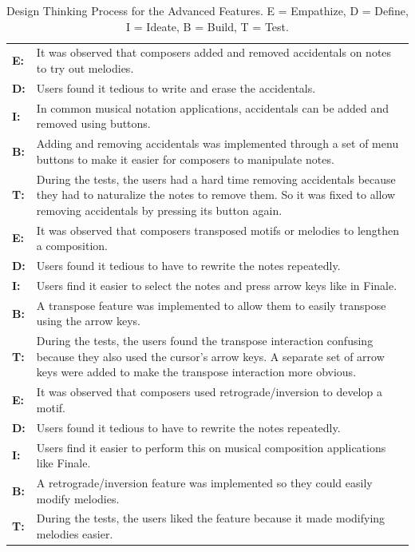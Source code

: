 		\begin{table} [H]
			\caption{Design Thinking Process for the Advanced Features. E = Empathize, D = Define, I = Ideate, B = Build, T = Test.} \label{tab:design-thinking-advanced}
			\vspace{0.20cm}   
			\begin{tabular}{|p{2.5cm} p{12.5cm}|}
			  	\hline

			  	\textbf{E:} 	& It was observed that composers added and removed accidentals on notes to try out melodies. \\
			  	\textbf{D:} 	& Users found it tedious to write and erase the accidentals. \\
			  	\textbf{I:} 		& In common musical notation applications, accidentals can be added and removed using buttons. \\
			  	\textbf{B:} 	& Adding and removing accidentals was implemented through a set of menu buttons to make it easier for composers to manipulate notes. \\
			  	\textbf{T:} 	& During the tests, the users had a hard time removing accidentals because they had to naturalize the notes to remove them. So it was fixed to allow removing accidentals by pressing its button again. \\
			  	\hline
			  	
			  	\textbf{E:} 	& It was observed that composers transposed motifs or melodies to lengthen a composition. \\
			  	\textbf{D:} 	& Users found it tedious to have to rewrite the notes repeatedly. \\
			  	\textbf{I:} 		& Users find it easier to select the notes and press arrow keys like in Finale. \\
			  	\textbf{B:} 	& A transpose feature was implemented to allow them to easily transpose using the arrow keys. \\
			  	\textbf{T:} 	& During the tests, the users found the transpose interaction confusing because they also used the cursor's arrow keys. A separate set of arrow keys were added to make the transpose interaction more obvious. \\
			  	\hline

			  	\textbf{E:} 	& It was observed that composers used retrograde/inversion to develop a motif. \\
			  	\textbf{D:} 	& Users found it tedious to have to rewrite the notes repeatedly. \\
			  	\textbf{I:} 		& Users find it easier to perform this on musical composition applications like Finale. \\
			  	\textbf{B:} 	& A retrograde/inversion feature was implemented so they could easily modify melodies. \\
			  	\textbf{T:} 	& During the tests, the users liked the feature because it made modifying melodies easier. \\
			  	\hline


\end{tabular}
\end{table}
